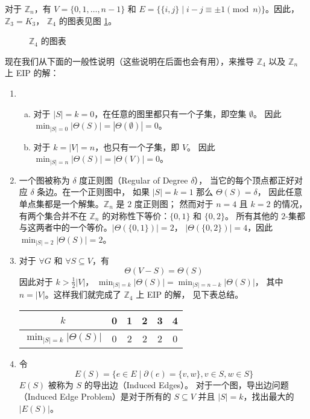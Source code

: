\documentclass[12pt, a4paper]{article}
\begin{document}
对于 $\mathbb{Z}_n$，有 $V = \{0, 1, \dots, n − 1\}$ 和
$E = \{\{i, j\} \mid i − j \equiv \pm 1 \pmod n\}$。因此，$\mathbb{Z}_3 = K_3$，
$\mathbb{Z}_4$ 的图表见图 \ref{Figure 1}。

\begin{figure}
	\centering
	
	\caption{$\mathbb{Z}_4$ 的图表}
	\label{Figure 1}
\end{figure}

现在我们从下面的一般性说明（这些说明在后面也会有用），来推导 $\mathbb{Z}_4$ 以及
$\mathbb{Z}_n$ 上 EIP 的解：

\begin{enumerate}[(1)]
	\item \begin{enumerate}[(a)]
		\item 对于 $|S| = k = 0$，在任意的图里都只有一个子集，即空集 $\emptyset$。
			因此 $\min_{|S| = 0} |\Theta(S)| = |\Theta(\emptyset)| = 0$。
		\item 对于 $k = |V| = n$，也只有一个子集，即 $V$。
			因此 $\min_{|S| = n} |\Theta(S)| = |\Theta(V)| = 0$。
		\end{enumerate}
	\item 一个图被称为 $\delta$ 度正则图（Regular of Degree $\delta$），
		当它的每个顶点都正好对应 $\delta$ 条边。在一个正则图中，
		如果 $|S| = k = 1$ 那么 $\Theta(S) = \delta$，
		因此任意单点集都是一个解集。$\mathbb{Z}_n$ 是 $2$ 度正则图；
		然而对于 $n = 4$ 且 $k = 2$ 的情况，有两个集合并不在 $\mathbb{Z}_n$
		的对称性下等价：$\{0, 1\}$ 和 $\{0, 2\}$。
		所有其他的 $2$-集都与这两者中的一个等价。$|\Theta(\{0, 1\})| = 2$，
		$|\Theta(\{0, 2\})| = 4$，因此 $\min_{|S| = 2} |\Theta(S)| = 2$。
	\item 对于 $\forall G$ 和 $\forall S \subseteq V$，有
		\begin{equation*}
		\Theta(V − S) = \Theta(S)
		\end{equation*}
		因此对于 $k > \frac{1}{2} |V|$，
		$\min_{|S| = k} |\Theta(S)| = \min_{|S| = n − k} |\Theta(S)|$，
		其中 $n = |V|$。这样我们就完成了 $\mathbb{Z}_4$ 上 EIP 的解，
		见下表总结。
		\begin{center}
			\begin{tabular}{ c | c c c c c }
			$k$                          & 0 & 1 & 2 & 3 & 4 \\
			\hline
			$\min_{|S| = k} |\Theta(S)|$ & 0 & 2 & 2 & 2 & 0
			\end{tabular}
		\end{center}
	\item 令
		\begin{equation*}
		E(S) = \{e \in E \mid \partial(e) = \{v, w\}, v \in S, w \in S\}
		\end{equation*}
		$E(S)$ 被称为 $S$ 的导出边（Induced Edges）。
		对于一个图，导出边问题（Induced Edge Problem）是对于所有的
		$S \subseteq V$ 并且 $|S| = k$，找出最大的 $|E(S)|$。
\end{enumerate}
\end{document}

